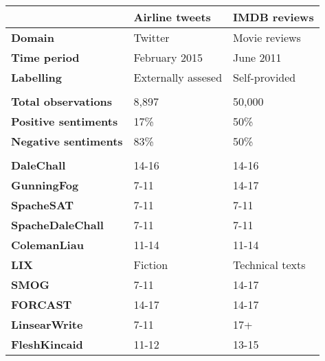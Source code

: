 \begin{tabular}{|l|l|l|} \cline{2-3}
\multicolumn{1}{c|}{} & \textbf{Airline tweets} & \textbf{IMDB reviews} \\ \hline
\textbf{Domain} & Twitter & Movie reviews \\ \hline
\textbf{Time period} & February 2015 & June 2011 \\ \hline
\textbf{Labelling} & Externally assesed & Self-provided\\ \hline
 \multicolumn{3}{c}{} \\ [-1.5ex] \hline
\textbf{Total observations} & 8,897 & 50,000 \\ \hline
\textbf{Positive sentiments} & 17\% & 50\% \\ \hline
\textbf{Negative sentiments} & 83\% & 50\%\\ \hline
 \multicolumn{3}{c}{} \\ [-1.5ex] \hline
\textbf{DaleChall} & 14-16 & 14-16 \\ \hline
\textbf{GunningFog} & 7-11 & 14-17 \\ \hline
\textbf{SpacheSAT} & 7-11 & 7-11 \\ \hline
\textbf{SpacheDaleChall} & 7-11 & 7-11 \\ \hline
\textbf{ColemanLiau} & 11-14 & 11-14 \\ \hline
\textbf{LIX} & Fiction & Technical texts \\ \hline
\textbf{SMOG} & 7-11 & 14-17 \\ \hline
\textbf{FORCAST} & 14-17 & 14-17 \\ \hline
\textbf{LinsearWrite} & 7-11 & 17+ \\ \hline
\textbf{FleshKincaid} & 11-12 & 13-15 \\ \hline
\end{tabular}